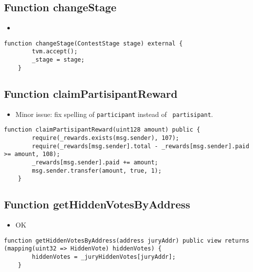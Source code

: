 \subsection{Function changeStage}

\begin{itemize}
\item {}
\end{itemize}

\begin{lstlisting}[firstnumber=234]
    function changeStage(ContestStage stage) external {
        tvm.accept();
        _stage = stage;
    }
\end{lstlisting}

\subsection{Function claimPartisipantReward}

\begin{itemize}
\item Minor issue: fix spelling of {\tt participant} instead of {\tt
  partisipant}.
\end{itemize}

\begin{lstlisting}[firstnumber=197]
    function claimPartisipantReward(uint128 amount) public {
        require(_rewards.exists(msg.sender), 107);
        require(_rewards[msg.sender].total - _rewards[msg.sender].paid >= amount, 108);
        _rewards[msg.sender].paid += amount;
        msg.sender.transfer(amount, true, 1);
    }
\end{lstlisting}

\subsection{Function getHiddenVotesByAddress}

\begin{itemize}
\item OK
\end{itemize}

\begin{lstlisting}[firstnumber=145]
    function getHiddenVotesByAddress(address juryAddr) public view returns (mapping(uint32 => HiddenVote) hiddenVotes) {
        hiddenVotes = _juryHiddenVotes[juryAddr];
    }
\end{lstlisting}

